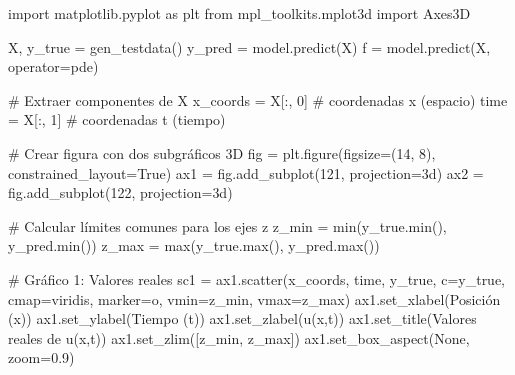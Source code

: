\documentclass[
  spanish,
  us-letterpaper,
]{scrreprt}
\newenvironment{Shaded}{\begin{snugshade}}{\end{snugshade}}
\newcommand{\BuiltInTok}[1]{\textcolor[rgb]{0.00,0.23,0.31}{#1}}
\newcommand{\CommentTok}[1]{\textcolor[rgb]{0.37,0.37,0.37}{#1}}
\newcommand{\DecValTok}[1]{\textcolor[rgb]{0.68,0.00,0.00}{#1}}
\newcommand{\FloatTok}[1]{\textcolor[rgb]{0.68,0.00,0.00}{#1}}
\newcommand{\ImportTok}[1]{\textcolor[rgb]{0.00,0.46,0.62}{#1}}
\newcommand{\NormalTok}[1]{\textcolor[rgb]{0.00,0.23,0.31}{#1}}
\newcommand{\OperatorTok}[1]{\textcolor[rgb]{0.37,0.37,0.37}{#1}}
\newcommand{\StringTok}[1]{\textcolor[rgb]{0.13,0.47,0.30}{#1}}
\newcommand{\VariableTok}[1]{\textcolor[rgb]{0.07,0.07,0.07}{#1}}
\theoremstyle{definition}
\theoremstyle{plain}
\theoremstyle{remark}
\begin{document}
\begin{Shaded}
\begin{Highlighting}[]
\ImportTok{import}\NormalTok{ matplotlib.pyplot }\ImportTok{as}\NormalTok{ plt }
\ImportTok{from}\NormalTok{ mpl\_toolkits.mplot3d }\ImportTok{import}\NormalTok{ Axes3D}

\NormalTok{X, y\_true }\OperatorTok{=}\NormalTok{ gen\_testdata()}
\NormalTok{y\_pred }\OperatorTok{=}\NormalTok{ model.predict(X)}
\NormalTok{f }\OperatorTok{=}\NormalTok{ model.predict(X, operator}\OperatorTok{=}\NormalTok{pde)}

\CommentTok{\# Extraer componentes de X}
\NormalTok{x\_coords }\OperatorTok{=}\NormalTok{ X[:, }\DecValTok{0}\NormalTok{]  }\CommentTok{\# coordenadas x (espacio)}
\NormalTok{time }\OperatorTok{=}\NormalTok{ X[:, }\DecValTok{1}\NormalTok{]      }\CommentTok{\# coordenadas t (tiempo)}

\CommentTok{\# Crear figura con dos subgráficos 3D}
\NormalTok{fig }\OperatorTok{=}\NormalTok{ plt.figure(figsize}\OperatorTok{=}\NormalTok{(}\DecValTok{14}\NormalTok{, }\DecValTok{8}\NormalTok{), constrained\_layout}\OperatorTok{=}\VariableTok{True}\NormalTok{)}
\NormalTok{ax1 }\OperatorTok{=}\NormalTok{ fig.add\_subplot(}\DecValTok{121}\NormalTok{, projection}\OperatorTok{=}\StringTok{\textquotesingle{}3d\textquotesingle{}}\NormalTok{)}
\NormalTok{ax2 }\OperatorTok{=}\NormalTok{ fig.add\_subplot(}\DecValTok{122}\NormalTok{, projection}\OperatorTok{=}\StringTok{\textquotesingle{}3d\textquotesingle{}}\NormalTok{)}

\CommentTok{\# Calcular límites comunes para los ejes z}
\NormalTok{z\_min }\OperatorTok{=} \BuiltInTok{min}\NormalTok{(y\_true.}\BuiltInTok{min}\NormalTok{(), y\_pred.}\BuiltInTok{min}\NormalTok{())}
\NormalTok{z\_max }\OperatorTok{=} \BuiltInTok{max}\NormalTok{(y\_true.}\BuiltInTok{max}\NormalTok{(), y\_pred.}\BuiltInTok{max}\NormalTok{())}

\CommentTok{\# Gráfico 1: Valores reales}
\NormalTok{sc1 }\OperatorTok{=}\NormalTok{ ax1.scatter(x\_coords, time, y\_true, c}\OperatorTok{=}\NormalTok{y\_true,}
\NormalTok{                cmap}\OperatorTok{=}\StringTok{\textquotesingle{}viridis\textquotesingle{}}\NormalTok{, marker}\OperatorTok{=}\StringTok{\textquotesingle{}o\textquotesingle{}}\NormalTok{, vmin}\OperatorTok{=}\NormalTok{z\_min, vmax}\OperatorTok{=}\NormalTok{z\_max)}
\NormalTok{ax1.set\_xlabel(}\StringTok{\textquotesingle{}Posición (x)\textquotesingle{}}\NormalTok{)}
\NormalTok{ax1.set\_ylabel(}\StringTok{\textquotesingle{}Tiempo (t)\textquotesingle{}}\NormalTok{)}
\NormalTok{ax1.set\_zlabel(}\StringTok{\textquotesingle{}u(x,t)\textquotesingle{}}\NormalTok{)}
\NormalTok{ax1.set\_title(}\StringTok{\textquotesingle{}Valores reales de u(x,t)\textquotesingle{}}\NormalTok{)}
\NormalTok{ax1.set\_zlim([z\_min, z\_max])}
\NormalTok{ax1.set\_box\_aspect(}\VariableTok{None}\NormalTok{, zoom}\OperatorTok{=}\FloatTok{0.9}\NormalTok{)}


\end{Highlighting}
\end{Shaded}
\end{document}
